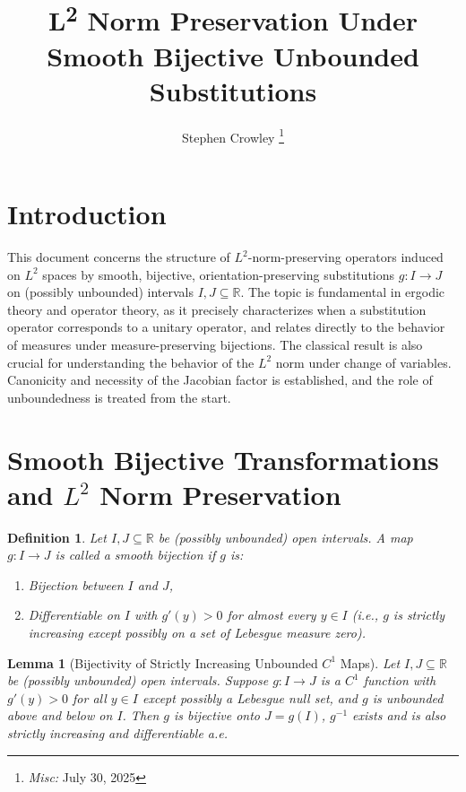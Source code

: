 \documentclass{article}
\newcommand{\tmem}[1]{{\em #1\/}}
\newcommand{\tmmisc}[1]{\thanks{\textit{Misc:} #1}}
\newcommand{\tmrsup}[1]{\textsuperscript{#1}}
\newtheorem{definition}{Definition}
\newtheorem{lemma}{Lemma}
\begin{document}
\title{L\tmrsup{2} Norm Preservation Under Smooth Bijective Unbounded
Substitutions}

\author{
  Stephen Crowley
  \tmmisc{July 30, 2025}
}

\date{}

\maketitle

{\tableofcontents}

\section{Introduction}

This document concerns the structure of $L^2$-norm-preserving operators
induced on $L^2$ spaces by smooth, bijective, orientation-preserving
substitutions $g : I \to J$ on (possibly unbounded) intervals $I, J \subseteq
\mathbb{R}$. The topic is fundamental in ergodic theory and operator theory,
as it precisely characterizes when a substitution operator corresponds to a
unitary operator, and relates directly to the behavior of measures under
measure-preserving bijections. The classical result is also crucial for
understanding the behavior of the $L^2$ norm under change of variables.
Canonicity and necessity of the Jacobian factor is established, and the role
of unboundedness is treated from the start.

\section{Smooth Bijective Transformations and $L^2$ Norm Preservation}

\begin{definition}
  \label{def:bijectiveC1}Let $I, J \subseteq \mathbb{R}$ be (possibly
  unbounded) open intervals. A map $g : I \to J$ is called a {\tmem{smooth
  bijection}} if $g$ is:
  \begin{enumerate}
    \item Bijection between $I$ and $J$,
    
    \item Differentiable on $I$ with $g' (y) > 0$ for almost every $y \in I$
    (i.e., $g$ is strictly increasing except possibly on a set of Lebesgue
    measure zero).
  \end{enumerate}
\end{definition}

\begin{lemma}
  [Bijectivity of Strictly Increasing Unbounded $C^1$
  Maps]\label{lem:bijective_unbounded} Let $I, J \subseteq \mathbb{R}$ be
  (possibly unbounded) open intervals. Suppose $g : I \to J$ is a $C^1$
  function with $g' (y) > 0$ for all $y \in I$ except possibly a Lebesgue null
  set, and $g$ is unbounded above and below on $I$. Then $g$ is bijective onto
  $J = g (I)$, $g^{- 1}$ exists and is also strictly increasing and
  differentiable a.e.
\end{lemma}
\end{document}
